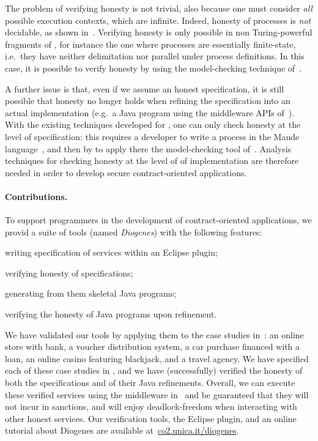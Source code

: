 %
The problem of verifying honesty is not trivial, 
also because one must consider \emph{all} possible execution contexts, 
which are infinite. %
Indeed, honesty of \coco processes is \emph{not} decidable, 
as shown in~\cite{Bartoletti15wsfm}. 
Verifying honesty is only possible in non Turing-powerful fragments of \coco,
for instance the one where processes are essentially finite-state,
i.e.\ they have neither delimitation nor parallel under process definitions. %
In this case, it is possible to verify honesty 
by using the model-checking technique of~\cite{BMSZ15jlamp}. %

A further issue is that, 
even if we assume an honest \coco specification, 
it is still possible that honesty no longer holds 
when refining the specification into an actual implementation 
(e.g.\ a Java program using the middleware APIs of~\cite{CO2middleware}). %
%
With the existing techniques developed for \coco, 
one can only check honesty at the level of specification:
this requires a developer to
write a \coco process in the Maude language~\cite{Maude01},
and then by to apply there the model-checking tool of~\cite{BCPZ15jlamp}. %
Analysis techniques for checking honesty at the level of of implementation
are therefore needed in order to develop secure contract-oriented applications.

\paragraph{Contributions.}

To support programmers in the development of contract-oriented 
applications, we provid a suite of tools (named \emph{Diogenes}) 
with the following features:
\begin{inlinelist}
\item writing \coco specification of services within an Eclipse plugin;
\item verifying honesty of \coco specifications;
\item generating from them skeletal Java programs;
\item verifying the honesty of Java programs upon refinement.
\end{inlinelist}
We have validated our tools by applying them to
the case studies in~\cite{BMSZ15jlamp}:
an online store with bank,
a voucher distribution system,
a car purchase financed with a loan,
an online casino featuring blackjack,
and a travel agency.
We have specified each of these case studies in \coco,
and we have (successfully) verified the honesty of 
both the specifications and of their Java refinements.
Overall, we can execute these verified services using the middleware in~\cite{CO2middleware}
and be guaranteed that they will not incur in sanctions,
and will enjoy deadlock-freedom when interacting with other honest services.
Our verification tools, the Eclipse plugin, and an online tutorial about Diogenes
are available at~\url{co2.unica.it/diogenes}.
